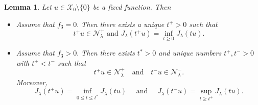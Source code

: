 \documentclass[11pt]{article}
\newtheorem{lemma}{Lemma}[section] %
\newcommand{\X}{\mathcal{X}_{0}}
\newcommand{\la} {\lambda}
\newcommand{\ds} {\displaystyle}
\begin{document}
\begin{lemma}\label{lm:fiber_map_analysis}
Let $u \in \X \setminus \{0\}$
be a fixed function.
Then
\begin{itemize}
    
\item[(i)] Assume that $f_3=0.$
Then there exists a unique $t^+ > 0$
such that 
    \begin{equation*}
t^+ u \in \mathcal{N}_\lambda^+ \text{ and } 
J_\la(t^+u)=\ds\inf_{t\ge 0}J_\la(tu).
\end{equation*}
    
\item[(ii)] Assume that $f_3 > 0.$
Then there exists $t^*>0$
and unique numbers $t^+,t^->0$
with $t^+< t^-$
such that
    \begin{equation*}
t^+ u \in \mathcal{N}_\lambda^+ \quad \text{and} 
\quad t^- u \in \mathcal{N}_\lambda^-.
    \end{equation*}
    Moreover,
\begin{equation*}
J_\la(t^+u)=\ds\inf_{0\le t\le t^*}J_\la(tu) 
\quad\text{ and }\quad
J_\la(t^-u)=\ds\sup_{t\ge t^+}J_\la(tu).
			\end{equation*}
     
\end{itemize}
\end{lemma}
\end{document}
